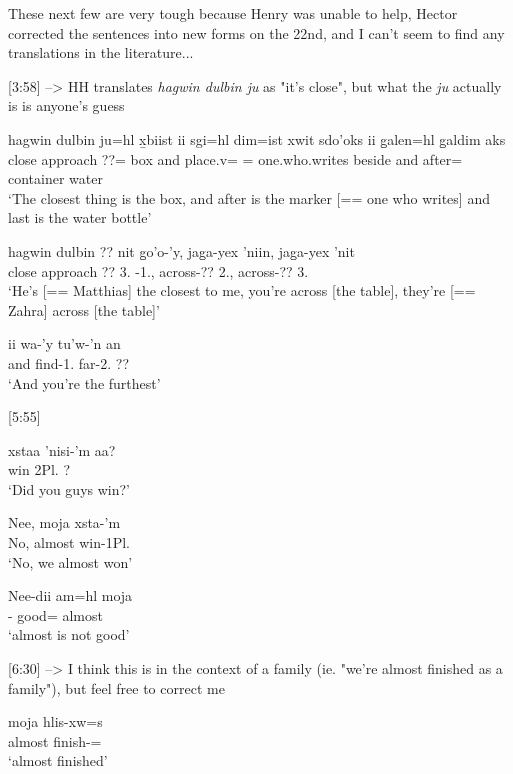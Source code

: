 These next few are very tough because Henry was unable to help, Hector corrected the sentences into new forms on the 22nd, and I can't seem to find any translations in the literature...

[3:58] --> HH translates \textit{hagwin dulbin ju} as "it's close", but what the \textit{ju} actually is is anyone's guess
\begin{exe}
\ex \begin{xlist}
\item \gll hagwin dulbin ju=hl x̱biist ii sgi=hl dim=ist xwit sdo'oks ii g̱alen=hl g̱aldim aks\\
close approach ??=\Cn{} box and place.v=\Cn{} \Fut{}=\Qudd{} one.who.writes beside and after=\Cn{} container water\\
`The closest thing is the box, and after is the marker [== one who writes] and last is the water bottle'
\item hagwin dulbin ?? nit g̱o'o-'y, jag̱a-yex 'niin, jag̱a-yex 'nit\\
close approach ?? 3.\Iii{} \Loc{}-1.\Ii{},  across-?? 2.\Iii{}, across-?? 3.\Iii{}\\
`He's [== Matthias] the closest to me, you're across [the table], they're [== Zahra] across [the table]'
\item ii wa-'y tu'w-'n an \\
and find-1.\Ii{} far-2.\Ii{} ??\\
`And you're the furthest'
\end{xlist}
\end{exe}

[5:55]
\begin{exe}
\ex \begin{xlist}
\item \gll xstaa 'nisi-'m aa?\\
win 2Pl.\Iii{} \Q{}?\\
`Did you guys win?'
\item \gll Nee, moja xsta-'m\\
No, almost win-1Pl.\Ii{}\\
`No, we almost won'
\item \gll Nee-dii am=hl moja\\
\Neg{}-\Foc{} good=\Cn{} almost\\
`almost is not good'
\end{xlist}
\end{exe}

[6:30] --> I think this is in the context of a family (ie. "we're almost finished as a family"), but feel free to correct me
\begin{exe}
\ex \gll moja hlis-xw=s\\
almost finish-\Val{}=\Pn{}\\
`almost finished'
\end{exe}


